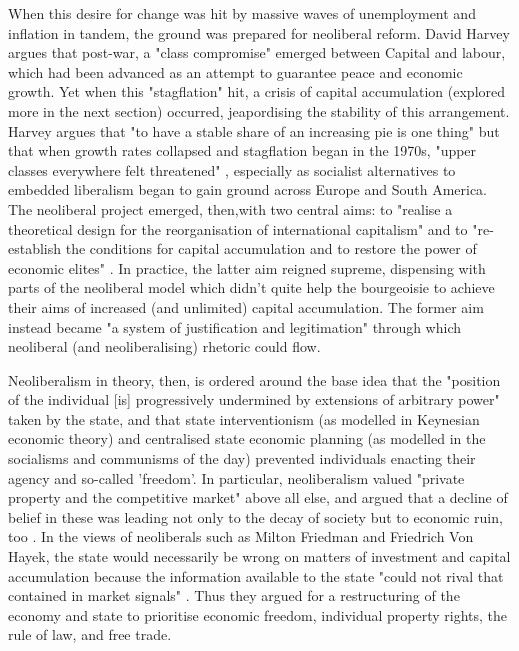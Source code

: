 When this desire for change was hit by massive waves of unemployment and inflation in tandem, the ground was prepared for neoliberal reform.  David Harvey argues that post-war, a "class compromise" \citep[10]{harvey_brief_2007} emerged between Capital and labour, which had been advanced as an attempt to guarantee peace and economic growth. Yet when this "stagflation" \citep[12]{harvey_brief_2007} hit, a crisis of capital accumulation (explored more in the next section) occurred, jeapordising the stability of this arrangement. Harvey argues that "to have a stable share of an increasing pie is one thing" but that when growth rates collapsed and stagflation began in the 1970s, "upper classes everywhere felt threatened" \citep[39]{harvey_brief_2007}, especially as socialist alternatives to embedded liberalism began to gain ground across Europe and South America. The neoliberal project emerged, then,with two central aims: to "realise a theoretical design for the reorganisation of international capitalism" and to "re-establish the conditions for capital accumulation and to restore the power of economic elites" \citep[45]{harvey_brief_2007}. In practice, the latter aim reigned supreme, dispensing with parts of the neoliberal model which didn't quite help the bourgeoisie to achieve their aims of increased (and unlimited) capital accumulation. The former aim instead became "a system of justification and legitimation" \citep[19]{harvey_brief_2007} through which neoliberal (and neoliberalising) rhetoric could flow.

Neoliberalism in theory, then, is ordered around the base idea that the "position of the individual [is] progressively undermined by extensions of arbitrary power" taken by the state, and that state interventionism (as modelled in Keynesian economic theory) and centralised state economic planning (as modelled in the socialisms and communisms of the day) prevented individuals enacting their agency and so-called 'freedom'. In particular, neoliberalism valued "private property and the competitive market" above all else, and argued that a decline of belief in these was leading not only to the decay of society but to economic ruin, too \citep[MONT PELERIN SOCIETY]{}. In the views of neoliberals such as Milton Friedman and Friedrich Von Hayek, the state would necessarily be wrong on matters of investment and capital accumulation because the information available to the state "could not rival that contained in market signals" \citep[49]{harvey_brief_2007}. Thus they argued for a restructuring of the economy and state to prioritise economic freedom, individual property rights, the rule of law, and free trade.

